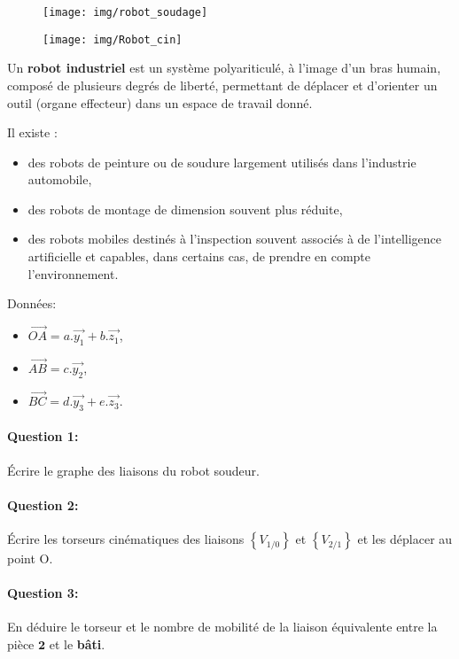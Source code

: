 \begin{figure}[htbp]
\begin{minipage}{0.4\linewidth}
\texttt{[image: img/robot\_soudage]}
\end{minipage}
\hfill
\begin{minipage}{0.55\linewidth}
\texttt{[image: img/Robot\_cin]}
\end{minipage}
\end{figure}

Un \textbf{robot industriel} est un système polyariticulé, à l'image d'un bras humain, composé de plusieurs degrés de liberté, permettant de déplacer et d'orienter un outil (organe effecteur) dans un espace de travail donné.

Il existe :
\begin{itemize}
 \item des robots de peinture ou de soudure largement utilisés dans l'industrie automobile,
 \item des robots de montage de dimension souvent plus réduite,
 \item des robots mobiles destinés à l'inspection souvent associés à de l'intelligence artificielle et capables, dans certains cas, de prendre en compte l'environnement.
\end{itemize}

Données:
\begin{itemize}
 \item $\overrightarrow{OA}=a.\overrightarrow{y_1}+b.\overrightarrow{z_1}$,
 \item $\overrightarrow{AB}=c.\overrightarrow{y_2}$,
 \item $\overrightarrow{BC}=d.\overrightarrow{y_3}+e.\overrightarrow{z_3}$.
\end{itemize}

\paragraph{Question 1:} Écrire le graphe des liaisons du robot soudeur.

\paragraph{Question 2:} Écrire les torseurs cinématiques des liaisons $\left\{V_{1/0}\right\}$ et $\left\{V_{2/1}\right\}$ et les déplacer au point O.

\paragraph{Question 3:} En déduire le torseur et le nombre de mobilité de la liaison équivalente entre la pièce $\textbf{2}$ et le \textbf{bâti}.

